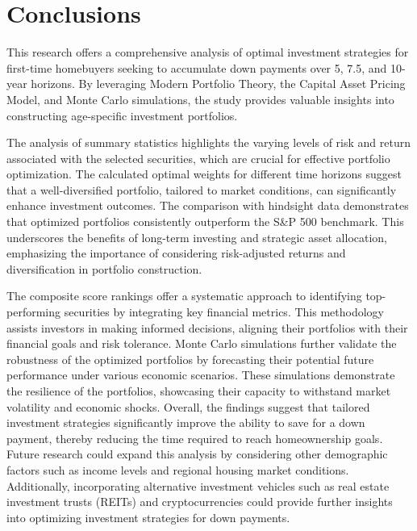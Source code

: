 \section{Conclusions}

This research offers a comprehensive analysis of optimal investment strategies for first-time homebuyers seeking to accumulate down payments over 5, 7.5, and 10-year horizons. By leveraging Modern Portfolio Theory, the Capital Asset Pricing Model, and Monte Carlo simulations, the study provides valuable insights into constructing age-specific investment portfolios.

The analysis of summary statistics highlights the varying levels of risk and return associated with the selected securities, which are crucial for effective portfolio optimization. The calculated optimal weights for different time horizons suggest that a well-diversified portfolio, tailored to market conditions, can significantly enhance investment outcomes. The comparison with hindsight data demonstrates that optimized portfolios consistently outperform the S\&P 500 benchmark. This underscores the benefits of long-term investing and strategic asset allocation, emphasizing the importance of considering risk-adjusted returns and diversification in portfolio construction.

The composite score rankings offer a systematic approach to identifying top-performing securities by integrating key financial metrics. This methodology assists investors in making informed decisions, aligning their portfolios with their financial goals and risk tolerance. Monte Carlo simulations further validate the robustness of the optimized portfolios by forecasting their potential future performance under various economic scenarios. These simulations demonstrate the resilience of the portfolios, showcasing their capacity to withstand market volatility and economic shocks. Overall, the findings suggest that tailored investment strategies significantly improve the ability to save for a down payment, thereby reducing the time required to reach homeownership goals. Future research could expand this analysis by considering other demographic factors such as income levels and regional housing market conditions. Additionally, incorporating alternative investment vehicles such as real estate investment trusts (REITs) and cryptocurrencies could provide further insights into optimizing investment strategies for down payments.

\newpage
